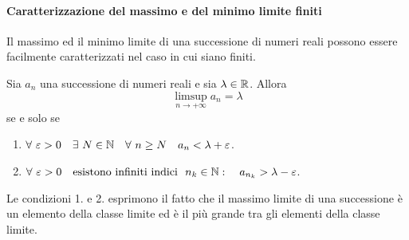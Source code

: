 \paragraph{Caratterizzazione del massimo e del minimo limite finiti}
Il massimo ed il minimo limite di una successione di numeri reali possono essere facilmente caratterizzati nel caso in cui siano finiti.
\begin{proposition}
	Sia $a_n$ una successione di numeri reali e sia $\lambda \in \mathbb{R}$. Allora
	\begin{equation*}
		\limsup_{n\to +\infty} a_n =\lambda
	\end{equation*}
	se e solo se
	\begin{enumerate}
		\item $\forall \ \varepsilon>0 \quad \exists \ N\in \mathbb{N}\quad \forall \ n\geq N \quad a_n<\lambda +\varepsilon$.
		\item $\forall \ \varepsilon>0 \quad \mbox{esistono infiniti indici }\ n_k\in \mathbb{N}:\quad a_{n_k}>\lambda-\varepsilon$.
	\end{enumerate}
\end{proposition}
\begin{observe}
	Le condizioni 1. e 2. esprimono il fatto che il massimo limite di una successione è un elemento della classe limite ed è il più grande tra gli elementi della classe limite.
\end{observe}
